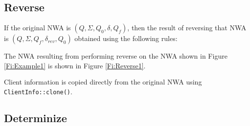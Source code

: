 

\subsection{Reverse}
\label{Se:Reverse}



If the original NWA is $(Q, \Sigma, Q_0, \delta, Q_f)$, then the result of
reversing that NWA is $(Q, \Sigma, Q_f, \delta_{rev}, Q_0)$ obtained using
the following rules:



The NWA resulting from performing reverse on the NWA shown in
Figure \ref{Fi:Example1} is shown in Figure \ref{Fi:Reverse1}.
 

Client
information is copied directly from the original NWA using
\texttt{ClientInfo::clone()}.

\subsection{Determinize}
\label{Se:Determinize}


